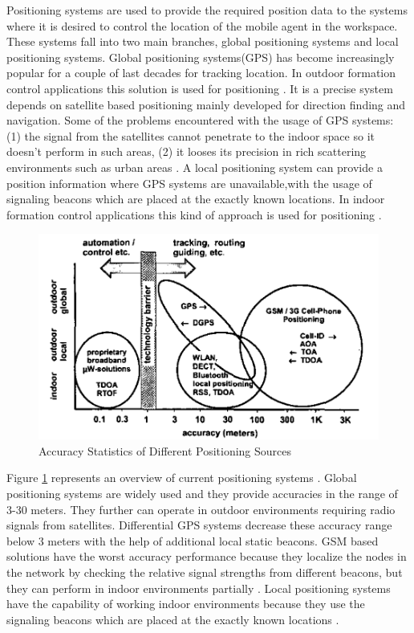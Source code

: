 Positioning systems are used to provide the required position data to the systems where it is desired to control the location of the mobile agent in the workspace. 
These systems fall into two main branches, global positioning systems and local positioning systems. Global positioning systems(GPS) has become increasingly popular for a couple of last decades for tracking location. In outdoor formation control applications this solution is used for positioning \cite{29}. It is a precise system depends on satellite based positioning mainly developed for direction finding and navigation.  Some of the problems encountered with the usage of GPS systems: (1) the signal from the satellites cannot penetrate to the indoor space so it doesn't perform in such areas, (2) it looses its precision in rich scattering environments such as urban areas \cite{19}.  A local positioning system can provide a position information where GPS systems are unavailable,with the usage of signaling beacons which are placed at the exactly known locations. In indoor formation control applications this kind of approach is used for positioning \cite{96}. 




\begin{figure}[H]
	\caption{Accuracy Statistics of Different Positioning Sources \cite{20}} \label{overview_position}
	\centering
	\includegraphics[scale = 0.4]{gps}
\end{figure} 

Figure \ref{overview_position} represents an overview of current positioning systems \cite{20}. Global positioning systems are widely used and they provide accuracies in the range of 3-30 meters. They further can operate in outdoor environments requiring radio signals from satellites. Differential GPS systems decrease these accuracy range below 3 meters with the help of additional local static beacons. GSM based solutions have the worst accuracy performance because they localize the nodes in the network by checking the relative signal strengths from different beacons, but they can perform in indoor environments partially \cite{20}.  Local positioning systems have the capability of working indoor environments because they use the signaling beacons which are placed at the exactly known locations \cite{20}. 


